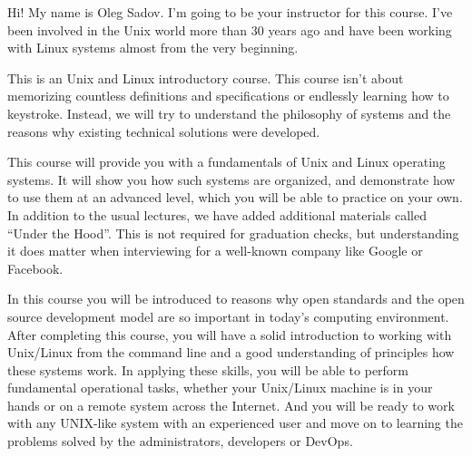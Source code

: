 Hi! My name is Oleg Sadov. I'm going to be your instructor for this course.
I've been involved in the Unix world more than 30 years ago and have been
working with Linux systems almost from the very beginning.

This is an Unix and Linux introductory course. This course isn't about
memorizing countless definitions and specifications or endlessly learning
how to keystroke. Instead, we will try to understand the philosophy of systems
and the reasons why existing technical solutions were developed.

This course will provide you with a fundamentals of Unix and Linux operating
systems. It will show you how such systems are organized, and demonstrate
how to use them at an advanced level, which you will be able to practice
on your own. In addition to the usual lectures, we have added additional
materials called ``Under the Hood''. This is not required for graduation checks,
but understanding it does matter when interviewing for a well-known company
like Google or Facebook.

In this course you will be introduced to reasons why open standards and
the open source development model are so important in today's computing
environment. After completing this course, you will have a solid introduction
to working with Unix/Linux from the command line and a good understanding of
principles how these systems work. In applying these skills, you will be able
to perform fundamental operational tasks, whether your Unix/Linux machine is
in your hands or on a remote system across the Internet. And you will be ready
to work with any UNIX-like system with an experienced user and move on
to learning the problems solved by the administrators, developers or DevOps.
